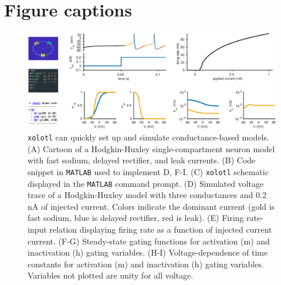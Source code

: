 \documentclass{frontiersSCNS} %
\begin{document}
%
%
%
%
%
%


\section*{Figure captions}

\FloatBarrier

\begin{figure}
	\centering
	\includegraphics[width=1.0\linewidth]{gfx/figure_HH}
	\caption{\texttt{xolotl} can quickly set up and simulate conductance-based models. (A) Cartoon of a Hodgkin-Huxley single-compartment neuron model with fast sodium, delayed rectifier, and leak currents. (B) Code snippet in \texttt{MATLAB} used to implement D, F-I. (C) \texttt{xolotl} schematic displayed in the \texttt{MATLAB} command prompt. (D) Simulated voltage trace of a Hodgkin-Huxley model with three conductances and 0.2 nA of injected current. Colors indicate the dominant current (gold is fast sodium, blue is delayed rectifier, red is leak). (E) Firing rate-input relation displaying firing rate as a function of injected current current. (F-G) Steady-state gating functions for activation (m) and inactivation (h) gating variables. (H-I) Voltage-dependence of time constants for activation (m) and inactivation (h) gating variables. Variables not plotted are unity for all voltage.}
	\label{fig:figurehh}
\end{figure}
\end{document}
